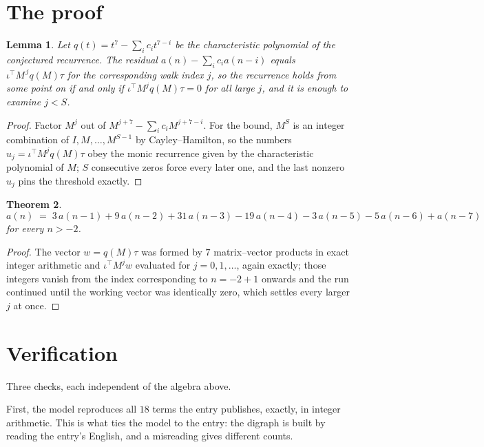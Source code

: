 \documentclass[11pt,a4paper]{article}
\theoremstyle{plain}
\newtheorem{theorem}{Theorem}
\newtheorem{lemma}[theorem]{Lemma}
\theoremstyle{definition}
\begin{document}
\section{The proof}

\begin{lemma}\label{lem:crit}
Let $q(t)=t^{7}-\sum_i c_it^{7-i}$ be the characteristic polynomial of the
conjectured recurrence. The residual $a(n)-\sum_ic_ia(n-i)$ equals
$\iota^{\!\top}M^{\,j}q(M)\tau$ for the corresponding walk index $j$, so the recurrence
holds from some point on if and only if $\iota^{\!\top}M^{j}q(M)\tau=0$ for all large $j$,
and it is enough to examine $j<S$.
\end{lemma}

\begin{proof}
Factor $M^{j}$ out of $M^{j+7}-\sum_ic_iM^{j+7-i}$. For the bound, $M^{S}$
is an integer combination of $I,M,\dots,M^{S-1}$ by Cayley--Hamilton, so the numbers
$u_j=\iota^{\!\top}M^{j}q(M)\tau$ obey the monic recurrence given by the characteristic
polynomial of $M$; $S$ consecutive zeros force every later one, and the last nonzero $u_j$
pins the threshold exactly.
\end{proof}

\begin{theorem}
\[
a(n)\;=\;3\,a(n-1) + 9\,a(n-2) + 31\,a(n-3) - 19\,a(n-4) - 3\,a(n-5) - 5\,a(n-6) + a(n-7)
\]
for every $n>-2$.
\end{theorem}

\begin{proof}
The vector $w=q(M)\tau$ was formed by $7$ matrix--vector products in exact integer
arithmetic and $\iota^{\!\top}M^{j}w$ evaluated for $j=0,1,\dots$, again exactly; those
integers vanish from the index corresponding to $n=-2+1$ onwards and the run continued
until the working vector was identically zero, which settles every larger $j$ at once.
\end{proof}

\section{Verification}

Three checks, each independent of the algebra above.

First, the model reproduces all $18$ terms the entry publishes, exactly, in integer
arithmetic. This is what ties the model to the entry: the digraph is built by reading the
entry's English, and a misreading gives different counts.
\end{document}
